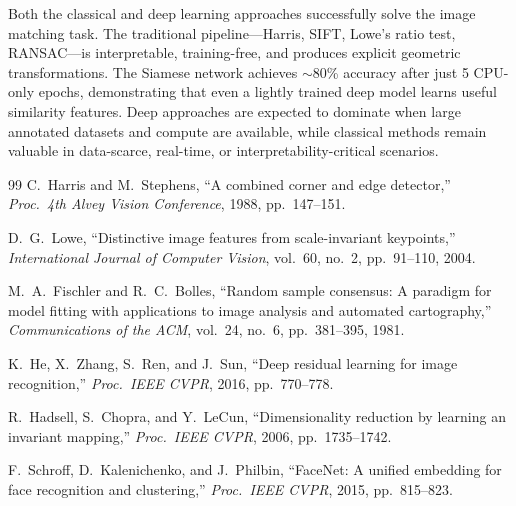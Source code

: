 \documentclass[11pt,letterpaper]{article}
\begin{document}
Both the classical and deep learning approaches successfully solve the image matching task. The traditional pipeline—Harris, SIFT, Lowe's ratio test, RANSAC—is interpretable, training-free, and produces explicit geometric transformations. The Siamese network achieves $\sim$80\% accuracy after just 5 CPU-only epochs, demonstrating that even a lightly trained deep model learns useful similarity features. Deep approaches are expected to dominate when large annotated datasets and compute are available, while classical methods remain valuable in data-scarce, real-time, or interpretability-critical scenarios.

\begin{thebibliography}{99}
  C.\ Harris and M.\ Stephens,
  ``A combined corner and edge detector,''
  \textit{Proc.\ 4th Alvey Vision Conference}, 1988, pp.\ 147--151.

  D.\ G.\ Lowe,
  ``Distinctive image features from scale-invariant keypoints,''
  \textit{International Journal of Computer Vision}, vol.~60, no.~2, pp.~91--110, 2004.

  M.\ A.\ Fischler and R.\ C.\ Bolles,
  ``Random sample consensus: A paradigm for model fitting with applications to image analysis and automated cartography,''
  \textit{Communications of the ACM}, vol.~24, no.~6, pp.~381--395, 1981.

  K.\ He, X.\ Zhang, S.\ Ren, and J.\ Sun,
  ``Deep residual learning for image recognition,''
  \textit{Proc.\ IEEE CVPR}, 2016, pp.~770--778.

  R.\ Hadsell, S.\ Chopra, and Y.\ LeCun,
  ``Dimensionality reduction by learning an invariant mapping,''
  \textit{Proc.\ IEEE CVPR}, 2006, pp.~1735--1742.

  F.\ Schroff, D.\ Kalenichenko, and J.\ Philbin,
  ``FaceNet: A unified embedding for face recognition and clustering,''
  \textit{Proc.\ IEEE CVPR}, 2015, pp.~815--823.
\end{thebibliography}
\end{document}
